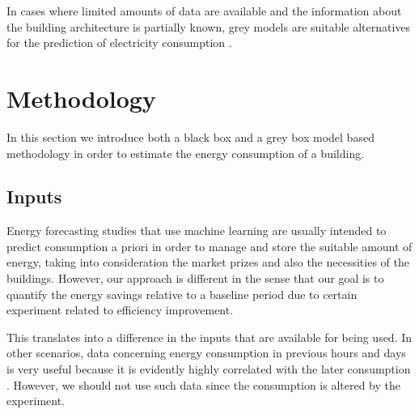 \documentclass[3p,times,procedia]{elsarticle}
\begin{document}
In cases where limited amounts of data are available and the information about the building architecture is partially known, grey models are suitable alternatives for the prediction of electricity consumption \cite{hamzacebi2014forecasting}.












\section{Methodology}

In this section we introduce both a black box and a grey box model based methodology in order to estimate the energy consumption of a building.

\subsection{Inputs}


Energy forecasting studies that use machine learning are usually intended to predict consumption a priori in order to manage and store the suitable amount of energy, taking into consideration the market prizes and also the necessities of the buildings. However, our approach is different in the sense that our goal is to quantify the energy savings relative to a baseline period due to certain experiment related to efficiency improvement. 

This translates into a difference in the inputs that are available for being used. In other scenarios, data concerning energy consumption in previous hours and days is very useful because it is evidently highly correlated with the later consumption \cite{aman2014empirical}. However, we should not use such data since the consumption is altered by the experiment.
\end{document}
